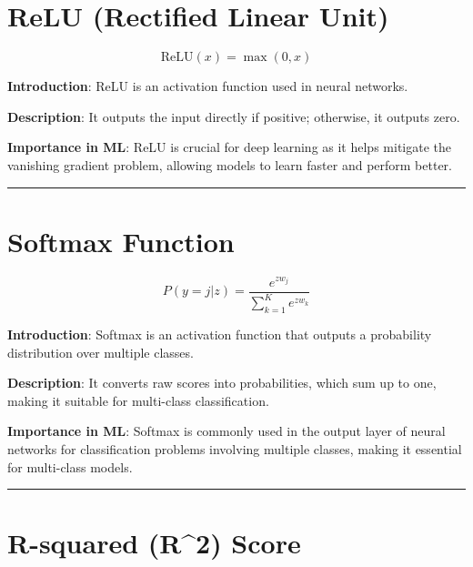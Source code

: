 \documentclass[
  12 pt,
  a4paper,
]{book}
\numberwithin{equation}{section}
\theoremstyle{plain}      %
\theoremstyle{definition} %
\theoremstyle{remark}     %
\theoremstyle{note}         %
\begin{document}
\newpage

\hypertarget{relu-rectified-linear-unit}{%
\chapter{ReLU (Rectified Linear
Unit)}\label{relu-rectified-linear-unit}}

\[
\text{ReLU}(x) = \max(0, x)
\]

\textbf{Introduction}: ReLU is an activation function used in neural
networks.

\textbf{Description}: It outputs the input directly if positive;
otherwise, it outputs zero.

\textbf{Importance in ML}: ReLU is crucial for deep learning as it helps
mitigate the vanishing gradient problem, allowing models to learn faster
and perform better.

\begin{center}\rule{0.5\linewidth}{0.5pt}\end{center}

\newpage

\hypertarget{softmax-function}{%
\chapter{Softmax Function}\label{softmax-function}}

\[
P(y = j | z) = \frac{e^{z w_j}}{\sum_{k=1}^K e^{z w_k}}
\]

\textbf{Introduction}: Softmax is an activation function that outputs a
probability distribution over multiple classes.

\textbf{Description}: It converts raw scores into probabilities, which
sum up to one, making it suitable for multi-class classification.

\textbf{Importance in ML}: Softmax is commonly used in the output layer
of neural networks for classification problems involving multiple
classes, making it essential for multi-class models.

\begin{center}\rule{0.5\linewidth}{0.5pt}\end{center}

\newpage

\hypertarget{r-squared-r2-score}{%
\chapter{R-squared (R\^{}2) Score}\label{r-squared-r2-score}}
\end{document}
